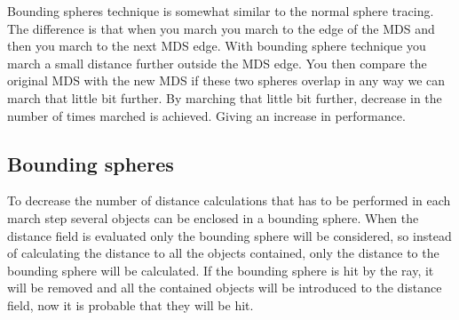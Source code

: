 			Bounding spheres technique is somewhat similar to the normal sphere
			tracing. The difference is that when you march you march to the
			edge of the MDS and then you march to the next MDS edge. With
			bounding sphere technique you march a small distance further
			outside the MDS edge. You then compare the original MDS with the
			new MDS if these two spheres overlap in any way we can march that
			little bit further. By marching that little bit further, decrease
			in the number of times marched is achieved. Giving an increase in
			performance. 

		\subsection{Bounding spheres}
			
			To decrease the number of distance calculations that has to be 
			performed in each march step several objects can be enclosed in a 
			bounding sphere. When the distance field is evaluated only the 
			bounding sphere will be considered, so instead of calculating the 
			distance to all the objects contained, only the distance to the 
			bounding sphere will be calculated. If the bounding sphere is hit
			by the ray, it will be removed and all the contained objects will 
			be introduced to the distance field, now it is probable that they
			will be hit.
		
			
